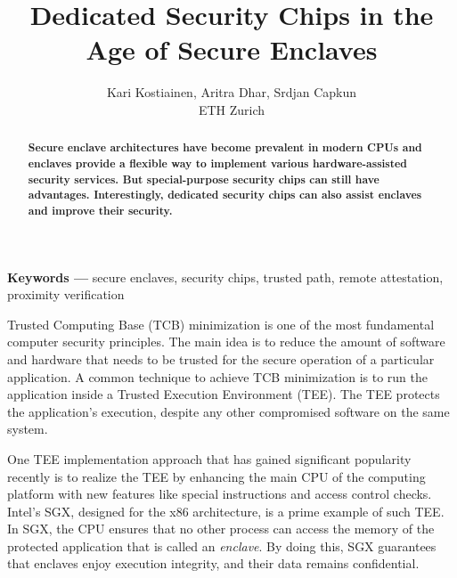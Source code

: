 \documentclass[letterpaper,twocolumn,10pt]{article}
\title{Dedicated Security Chips in the Age of Secure Enclaves}
\author{Kari Kostiainen, Aritra Dhar, Srdjan Capkun \\ ETH Zurich}
\begin{document}
\maketitle
\thispagestyle{empty}

\begin{abstract}
\textbf{Secure enclave architectures have become prevalent in modern CPUs and enclaves provide a flexible way to implement various hardware-assisted security services. But special-purpose security chips can still have advantages. Interestingly, dedicated security chips can also assist enclaves and improve their security.}
\end{abstract}

\vspace{10pt}
\noindent
\textbf{Keywords ---} secure enclaves, security chips, trusted path, remote attestation, proximity verification

%
%
%
%
%
%

% 
%

%


\vspace{10pt}

Trusted Computing Base (TCB) minimization is one of the most fundamental computer security principles. The main idea is to reduce the amount of software and hardware that needs to be trusted for the secure operation of a particular application. A common technique to achieve TCB minimization is to run the application inside a Trusted Execution Environment (TEE). The TEE protects the application's execution, despite any other compromised software on the same system.

One TEE implementation approach that has gained significant popularity recently is to realize the TEE by enhancing the main CPU of the computing platform with new features like special instructions and access control checks. Intel's SGX, designed for the x86 architecture, is a prime example of such TEE. In SGX, the CPU ensures that no other process can access the memory of the protected application that is called an \emph{enclave}. By doing this, SGX guarantees that enclaves enjoy execution integrity, and their data remains confidential.  
\end{document}

